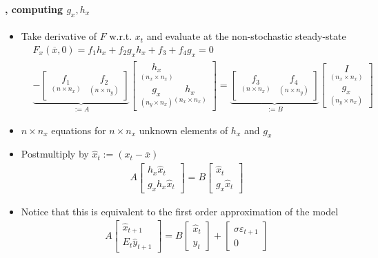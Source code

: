 \documentclass[handout]{beamer}  %
\begin{document}
\begin{frame}
\frametitle{\secname}\framesubtitle{\subsecname, computing $g_x,h_x$}\footnotesize
\begin{itemize}
  \item Take derivative of $F$ w.r.t. $x_t$ and evaluate at the non-stochastic steady-state
  \begin{eqnarray*}
&    F_x (\overline{x},0) = f_1 h_x + f_2 g_x h_x + f_3 + f_4 g_x = 0\\
& \underbrace{- \begin{bmatrix} \underset{(n\times n_x)}{f_1} & \underset{(n\times n_y)}{f_2} \end{bmatrix}}_{:=A} \begin{bmatrix} \underset{(n_x\times n_x)}{h_x} \\ \underset{(n_y\times n_x)}{g_x} \underset{(n_x\times n_x)}{h_x} \end{bmatrix}  = \underbrace{\begin{bmatrix} \underset{(n\times n_x)}{f_3} & \underset{(n\times n_y)}{f_4}\end{bmatrix}}_{:=B} \begin{bmatrix} \underset{(n_x\times n_x)}{I} \\\underset{(n_y\times n_x)}{g_x} \end{bmatrix}
  \end{eqnarray*}
  \item $n\times n_x$ equations for $n\times n_x$ unknown elements of $h_x$ and $g_x$
  \item Postmultiply by $\widehat{x}_t := (x_t-\overline{x})$
  \begin{align*}
    A \begin{bmatrix} h_x \widehat{x}_t \\ g_x h_x \widehat{x}_t \end{bmatrix} = B \begin{bmatrix} \widehat{x}_t \\ g_x \widehat{x}_t \end{bmatrix}
  \end{align*}
  \item Notice that this is equivalent to the first order approximation of the model
  \begin{eqnarray*}
    A\begin{bmatrix} \widehat{x}_{t+1} \\ E_t \widehat{y}_{t+1} \end{bmatrix} = B\begin{bmatrix} \widehat{x}_t\\ \widehat{y}_t \end{bmatrix} + \begin{bmatrix} \sigma \varepsilon_{t+1} \\ 0\end{bmatrix}
  \end{eqnarray*}
\end{itemize}
\end{frame}
\end{document}
